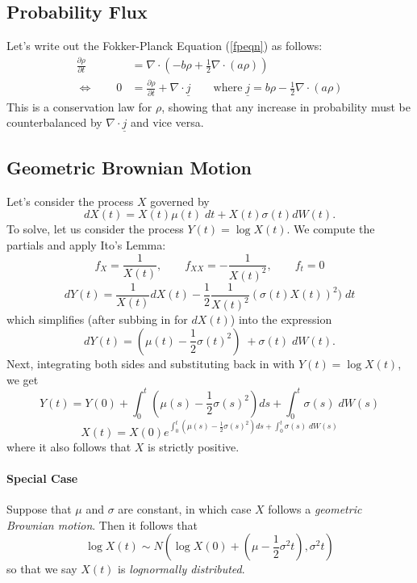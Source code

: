 \documentclass[12pt]{article}
\theoremstyle{plain}
\theoremstyle{definition}
\theoremstyle{remark}
\begin{document}
\subsection{Probability Flux}

Let's write out the Fokker-Planck Equation (\ref{fpeqn}) as follows:
\begin{align*}
  \frac{\partial\rho}{\partial t}
  &= \nabla \cdot \left( -b\rho + \frac{1}{2}\nabla \cdot (a\rho)\right)\\
  \Leftrightarrow\qquad
  0&=
  \frac{\partial\rho}{\partial t}
  + \nabla \cdot \underline{j}
  \qquad
  \text{where}\;
  \underline{j} = b\rho - \frac{1}{2}\nabla\cdot(a\rho)
\end{align*}
This is a conservation law for $\rho$, showing that any increase in
probability must be counterbalanced by $\nabla \cdot
\underline{j}$ and vice versa.


\clearpage






\subsection{Geometric Brownian Motion}

Let's consider the process $X$ governed by
   \[ dX(t) = X(t)\mu(t) \; dt + X(t) \sigma(t) dW(t).\]
To solve, let us consider the process $Y(t) = \log X(t)$.  We compute
the partials and apply Ito's Lemma:
   \[ f_X = \frac{1}{X(t)}, \qquad f_{XX} = -\frac{1}{X(t)^2},
      \qquad f_t = 0 \]
   \[ dY(t) = \frac{1}{X(t)} dX(t) - \frac{1}{2}\frac{1}{X(t)^2}
      (\sigma(t) X(t))^2 ) \; dt \]
which simplifies (after subbing in for $dX(t)$) into the expression
   \[ dY(t) = \left( \mu(t) - \frac{1}{2}\sigma(t)^2\right) \; +
      \sigma(t) \; dW(t).\]
Next, integrating both sides and substituting back in with
$Y(t) = \log X(t)$, we get
   \[ Y(t) = Y(0) + \int^t_0 \left( \mu(s)-\frac{1}{2}\sigma(s)^2\right)
      ds + \int^t_0 \sigma(s) \; dW(s) \]
   \[ X(t)=X(0) e^{\int^t_0 \left( \mu(s)-\frac{1}{2}\sigma(s)^2\right)
       ds + \int^t_0 \sigma(s) \; dW(s)}\]
where it also follows that $X$ is strictly positive.

\paragraph{Special Case} Suppose that $\mu$ and $\sigma$ are constant,
in which case $X$ follows a \emph{geometric Brownian motion}.  Then
it follows that
   \[ \log X(t) \sim N\left( \log X(0) + \left(\mu - \frac{1}{2} \sigma^2
      t\right), \sigma^2 t \right) \]
so that we say $X(t)$ is \emph{lognormally distributed}.
\end{document}
